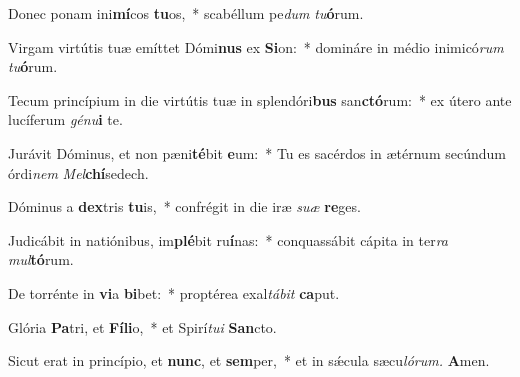 \item Donec ponam ini\textbf{mí}cos \textbf{tu}os,~* scabéllum pe\hspace{0.03em}\textit{dum} \textit{tu}\textbf{ó}rum.
\item Virgam virtútis tuæ emíttet Dómi\textbf{nus} ex \textbf{Si}on:~* domináre in médio inimicó\textit{rum} \textit{tu}\textbf{ó}rum.
\item Tecum princípium in die virtútis tuæ in splendóri\textbf{bus} san\textbf{ctó}rum:~* ex útero ante lucíferum \textit{génu}\textbf{i} te.
\item Jurávit Dóminus, et non pæni\textbf{té}bit \textbf{e}um:~* Tu es sacérdos in ætérnum secúndum órdi\hspace{0.03em}\textit{nem} \textit{Mel}\textbf{chí}sedech.
\item Dóminus a \textbf{dex}tris \textbf{tu}is,~* confrégit in die iræ \textit{suæ} \textbf{re}ges.
\item Judicábit in natiónibus, im\textbf{plé}bit ru\hspace{0.03em}\textbf{í}nas:~* conquassábit cápita in ter\textit{ra} \textit{mul}\textbf{tó}rum.
\item De torrénte in \textbf{vi}a \textbf{bi}bet:~* proptérea exal\hspace{0.03em}\textit{tábit} \textbf{ca}put.
\item Glória \textbf{Pa}tri, et \textbf{Fí}\textbf{li}o,~* et Spirí\hspace{0.03em}\textit{tui} \textbf{San}cto.
\item Sicut erat in princípio, et \textbf{nunc}, et \textbf{sem}per,~* et in sǽcula sæcu\hspace{0.03em}\textit{lórum.} \textbf{A}men.